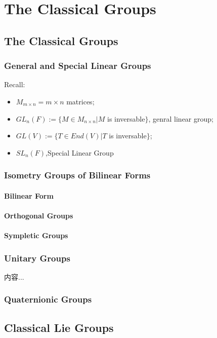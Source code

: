 \documentclass[Total.tex]{subfiles}
\begin{document}
	\chapter{The Classical Groups}
		\section{The Classical Groups}
			\subsection{General and Special Linear Groups}
			\begin{Def}
				Recall:
				\begin{itemize}
					\item $M_{m\times n}=m\times n$ matrices;
					\item $GL_n(F):=\{M\in M_{n\times n}|M$ is inversable$\}$, genral linear group;
					\item $GL(V):=\{T\in End(V)|T$ is inversable$\}$;
					\item  $SL_n(F)$,Special Linear Group
				\end{itemize}
			\end{Def}
			
			\subsection{Isometry Groups of Bilinear Forms}	
				\subsubsection{Bilinear Form}
				\subsubsection{Orthogonal Groups}
				\subsubsection{Sympletic Groups}
			\subsection{Unitary Groups}
				\begin{Def}
					内容...
				\end{Def}
			\subsection{Quaternionic Groups}
			\section{Classical Lie Groups}
			
\end{document}
